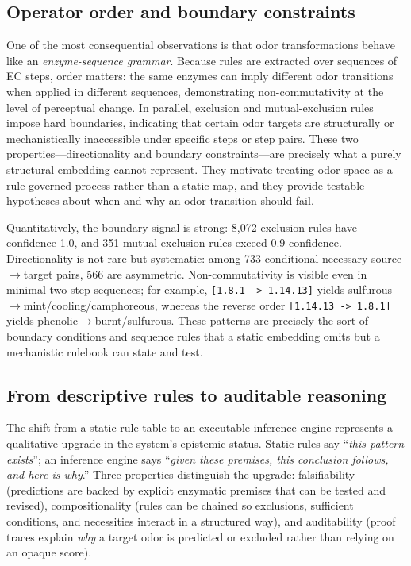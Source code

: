 \documentclass[a4paper,fleqn]{cas-sc}
\begin{document}
\subsection{Operator order and boundary constraints}

One of the most consequential observations is that odor transformations behave like an \emph{enzyme-sequence grammar}. Because rules are extracted over sequences of EC steps, order matters: the same enzymes can imply different odor transitions when applied in different sequences, demonstrating non-commutativity at the level of perceptual change. In parallel, exclusion and mutual-exclusion rules impose hard boundaries, indicating that certain odor targets are structurally or mechanistically inaccessible under specific steps or step pairs. These two properties---directionality and boundary constraints---are precisely what a purely structural embedding cannot represent. They motivate treating odor space as a rule-governed process rather than a static map, and they provide testable hypotheses about when and why an odor transition should fail.

Quantitatively, the boundary signal is strong: 8,072 exclusion rules have confidence 1.0, and 351 mutual-exclusion rules exceed 0.9 confidence. Directionality is not rare but systematic: among 733 conditional-necessary source$\rightarrow$target pairs, 566 are asymmetric. Non-commutativity is visible even in minimal two-step sequences; for example, \texttt{[1.8.1 -> 1.14.13]} yields sulfurous$\rightarrow$mint/cooling/camphoreous, whereas the reverse order \texttt{[1.14.13 -> 1.8.1]} yields phenolic$\rightarrow$burnt/sulfurous. These patterns are precisely the sort of boundary conditions and sequence rules that a static embedding omits but a mechanistic rulebook can state and test.

\subsection{From descriptive rules to auditable reasoning}

The shift from a static rule table to an executable inference engine represents a qualitative upgrade in the system's epistemic status. Static rules say ``\emph{this pattern exists}''; an inference engine says ``\emph{given these premises, this conclusion follows, and here is why}.'' Three properties distinguish the upgrade: falsifiability (predictions are backed by explicit enzymatic premises that can be tested and revised), compositionality (rules can be chained so exclusions, sufficient conditions, and necessities interact in a structured way), and auditability (proof traces explain \emph{why} a target odor is predicted or excluded rather than relying on an opaque score).
\end{document}
